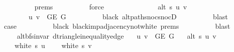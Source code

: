 \begin{isabellebody}
\ \ \ \ \ \ \ \ \isamarkupfalse%
\ {\isachardoublequoteopen}{}{\isachardot}{\kern0pt}prems{\isachardoublequoteclose}{\isacharparenleft}{\kern0pt}{}{\isacharparenright}{\kern0pt}\isanewline
\ \ \ \ \ \ \ \ \isamarkupfalse%
\ force\isanewline
\ \ \ \ \ \ \isamarkupfalse%
\isanewline
\ \ \ \ \ \ \ \ {\isachardoublequoteopen}alt\ s\ u\ v{\isachardoublequoteclose}\isanewline
\ \ \ \ \ \ \ \ {\isachardoublequoteopen}{\isacharbraceleft}{\kern0pt}u{\isacharcomma}{\kern0pt}\ v{\isacharbraceright}{\kern0pt}\ {\isasymin}\ G{\isachardot}{\kern0pt}E\ G{\isachardoublequoteclose}\isanewline
\ \ \ \ \ \ \ \ \isamarkupfalse%
\ black\ alt{\isacharunderscore}{\kern0pt}path{\isacharunderscore}{\kern0pt}snoc{\isacharunderscore}{\kern0pt}snocD\isanewline
\ \ \ \ \ \ \ \ \isamarkupfalse%
\ blast{\isacharplus}{\kern0pt}\isanewline
\ \ \ \ \ \ \isamarkupfalse%
\ {\isacharquery}{\kern0pt}case\isanewline
\ \ \ \ \ \ \ \ \isamarkupfalse%
\ black\ black{\isacharunderscore}{\kern0pt}imp{\isacharunderscore}{\kern0pt}adjacency{\isacharunderscore}{\kern0pt}not{\isacharunderscore}{\kern0pt}white\ {\isachardoublequoteopen}{}{\isachardot}{\kern0pt}prems{\isachardoublequoteclose}{\isacharparenleft}{\kern0pt}{}{\isacharparenright}{\kern0pt}\isanewline
\ \ \ \ \ \ \ \ \isamarkupfalse%
\ blast\isanewline
\ \ \ \ \isamarkupfalse%
\isanewline
\ \ \isamarkupfalse%
\isanewline
{}\isamarkupfalse%
%
\endisatagproof
{\isafoldproof}%
%
\isadelimproof
\isanewline
%
\endisadelimproof
%
\isadeliminvisible
\isanewline
%
\endisadeliminvisible
%
\isataginvisible
{}\isamarkupfalse%
\ {\isacharparenleft}{\kern0pt}\ alt{\isacharunderscore}{\kern0pt}bfs{\isacharunderscore}{\kern0pt}invar{\isacharparenright}{\kern0pt}\ d{\isacharunderscore}{\kern0pt}triangle{\isacharunderscore}{\kern0pt}inequality{\isacharunderscore}{\kern0pt}edge{\isacharcolon}{\kern0pt}\isanewline
\ \ \ {\isachardoublequoteopen}{\isacharbraceleft}{\kern0pt}u{\isacharcomma}{\kern0pt}\ v{\isacharbraceright}{\kern0pt}\ {\isasymin}\ G{\isachardot}{\kern0pt}E\ G{\isachardoublequoteclose}\isanewline
\ \ \ {\isachardoublequoteopen}alt\ s\ u\ v{\isachardoublequoteclose}\isanewline
\ \ \ {\isachardoublequoteopen}{\isasymnot}\ white\ s\ u{\isachardoublequoteclose}\isanewline
\ \ \ {\isachardoublequoteopen}{\isasymnot}\ white\ s\ v{\isachardoublequoteclose}\isanewline

\end{isabellebody}
